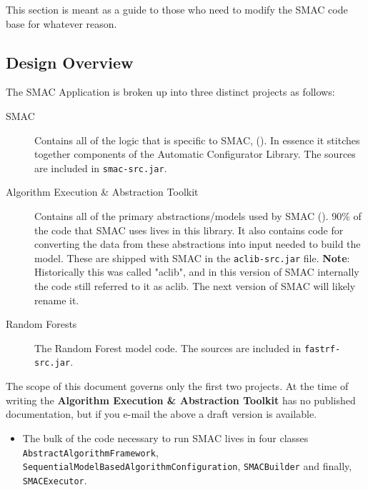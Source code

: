 \documentclass[manual.tex]{subfiles}
\begin{document}
This section is meant as a guide to those who need to modify the SMAC code base for whatever reason.

\subsection{Design Overview}

The SMAC Application is broken up into three distinct projects as follows:

\begin{description}

\item[SMAC] Contains all of the logic that is specific to SMAC, (). In essence it stitches together components of the Automatic Configurator Library. The sources are included in \texttt{smac-src.jar}.

\item[Algorithm Execution \& Abstraction Toolkit] Contains all of the primary abstractions/models used by SMAC (). 90\% of the code that SMAC uses lives in this library. It also contains code for converting the data from these abstractions into input needed to build the model. These are shipped with SMAC in the \texttt{aclib-src.jar} file. \textbf{Note}: Historically this was called "aclib", and in this version of SMAC internally the code still referred to it as aclib. The next version of SMAC will likely rename it.

\item[Random Forests] The Random Forest model code. The sources are included in \texttt{fastrf-src.jar}. 

\end{description}

The scope of this document governs only the first two projects. At the time of writing the \textbf{Algorithm Execution \& Abstraction Toolkit} has no published documentation, but if you e-mail the above a draft version is available.

\begin{itemize}

\item	The bulk of the code necessary to run SMAC lives in four classes \\ \texttt{AbstractAlgorithmFramework}, \\
 \texttt{SequentialModelBasedAlgorithmConfiguration}, \texttt{SMACBuilder} and finally, \\ \texttt{SMACExecutor}. 
\end{itemize}
\end{document}
